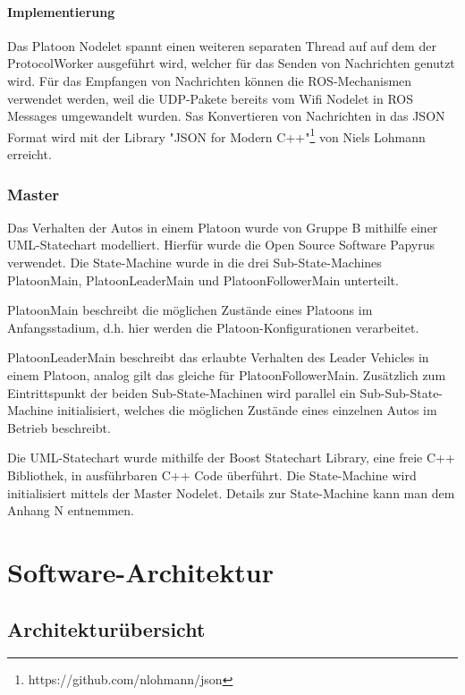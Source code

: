 \documentclass[a4paper, 12pt, titlepage]{scrartcl}
\begin{document}
				\paragraph{Implementierung}
				Das Platoon Nodelet spannt einen weiteren separaten Thread auf auf dem der ProtocolWorker ausgeführt wird, welcher für das Senden von Nachrichten genutzt wird. Für das Empfangen von Nachrichten können die ROS-Mechanismen verwendet werden, weil die UDP-Pakete bereits vom Wifi Nodelet in ROS Messages umgewandelt wurden. Sas Konvertieren von Nachrichten in das JSON Format wird mit der Library "JSON for Modern C++"\footnote{https://github.com/nlohmann/json} von Niels Lohmann erreicht.
    			
    			\subsubsection{Master}
    			\label{sw_b_master}
    			Das Verhalten der Autos in einem Platoon wurde von Gruppe B mithilfe einer UML-Statechart modelliert. Hierfür wurde die Open Source Software Papyrus verwendet. Die State-Machine wurde in die drei Sub-State-Machines PlatoonMain, PlatoonLeaderMain und PlatoonFollowerMain unterteilt.

    			PlatoonMain beschreibt die möglichen Zustände eines Platoons im Anfangsstadium, d.h. hier werden die Platoon-Konfigurationen verarbeitet.

    			PlatoonLeaderMain beschreibt das erlaubte Verhalten des Leader Vehicles in einem Platoon, analog gilt das gleiche für PlatoonFollowerMain. Zusätzlich zum Eintrittspunkt der beiden Sub-State-Machinen wird parallel ein Sub-Sub-State-Machine initialisiert, welches die möglichen Zustände eines einzelnen Autos im Betrieb beschreibt.

    			Die UML-Statechart wurde mithilfe der Boost Statechart Library, eine freie C++ Bibliothek, in ausführbaren C++ Code überführt. Die State-Machine wird initialisiert mittels der Master Nodelet. Details zur State-Machine kann man dem Anhang N entnemmen.
    			\newpage

	\section{Software-Architektur}
	\label{sw_architektur}
		\subsection{Architekturübersicht}
		\label{sw_uebersicht}
\end{document}
